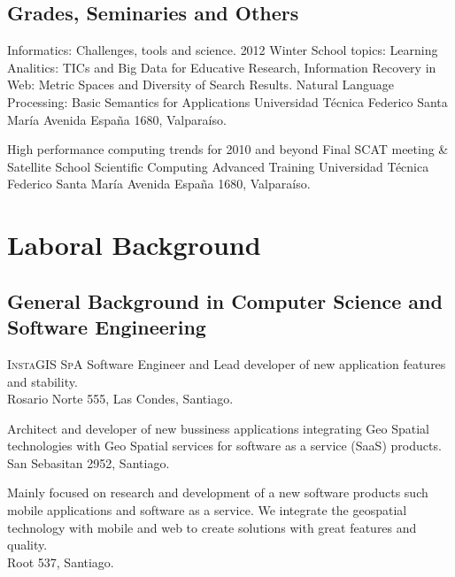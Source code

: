 \documentclass[11pt,letterpaper,roman]{moderncv}
\begin{document}
\subsection{Grades, Seminaries and Others}

	{Informatics: Challenges, tools and science.}
	{2012 Winter School}
	{topics: Learning Analitics: TICs and Big Data for Educative Research, Information Recovery in Web: Metric Spaces and Diversity of Search Results. Natural Language Processing: Basic Semantics for Applications }
	{Universidad T\'ecnica Federico Santa Mar\'ia}
	{Avenida España 1680, Valpara\'iso.}
	
	
	{High performance computing trends for 2010 and beyond}
	{Final SCAT meeting \& Satellite School}
	{Scientific Computing Advanced Training}
	{Universidad T\'ecnica Federico Santa Mar\'ia}
	{Avenida España 1680, Valpara\'iso.}


\section{Laboral Background}

\subsection{General Background in Computer Science and Software Engineering}

	 {\se} {\textsc{InstaGIS SpA}} {\stgo} {}
	{Software Engineer and Lead developer of new application features and stability.
	\\ Rosario Norte 555, Las Condes, Santiago.
	} 

	 {\se} {\mapcity} {\stgo} {}
	{Architect and developer of new bussiness applications integrating Geo Spatial technologies with Geo Spatial services for software as a service (SaaS) products.
	\\ San Sebasitan 2952, Santiago.
	} 

	 {\cf} {\ingennia} {\stgo} {}
	{Mainly focused on research and development of a new software products
	such mobile applications and software as a service. We integrate the geospatial
	technology with mobile and web to create solutions with great features and
	quality.
	\\ Root 537, Santiago.}
\end{document}
